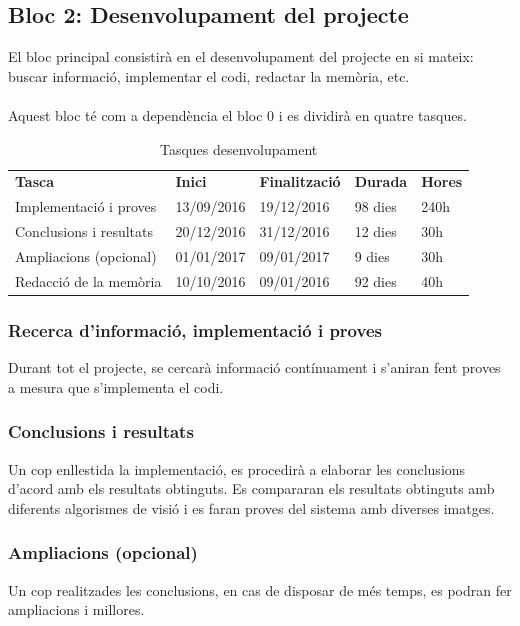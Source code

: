 	\subsection{Bloc 2: Desenvolupament del projecte}
			El bloc principal consistirà en el desenvolupament del projecte en si mateix: buscar informació, implementar el codi, redactar la memòria, etc.\\\\
			Aquest bloc té com a dependència el bloc 0 i es dividirà en quatre tasques.\\
			\begin{table}[H]
				\begin{center}
					\begin{tabular}{p{5cm} !{\vrule width -1pt}l !{\vrule width -1pt}l !{\vrule width -1pt}l !{\vrule width -1pt}l }
					\textbf{Tasca} & \textbf{Inici} & \textbf{Finalització} & \textbf{Durada} & \textbf{Hores} \\
					Implementació i proves & 13/09/2016 & 19/12/2016 & 98 dies & 240h \\
					Conclusions i resultats & 20/12/2016 & 31/12/2016 & 12 dies & 30h \\
					Ampliacions (opcional) & 01/01/2017 & 09/01/2017 & 9 dies & 30h \\
					Redacció de la memòria & 10/10/2016 & 09/01/2016 & 92 dies & 40h \\
					\end{tabular}
				\end{center}
				\caption{Tasques desenvolupament}
			\end{table}

		\subsubsection{Recerca d'informació, implementació i proves}
			Durant tot el projecte, se cercarà informació contínuament i s'aniran fent proves a mesura que s'implementa el codi.
		\subsubsection{Conclusions i resultats}
			Un cop enllestida la implementació, es procedirà a elaborar les conclusions d'acord amb els resultats obtinguts. Es compararan els resultats obtinguts amb diferents algorismes de visió i es faran
			proves del sistema amb diverses imatges.
		\subsubsection{Ampliacions (opcional)}
			Un cop realitzades les conclusions, en cas de disposar de més temps, es podran fer ampliacions i millores.
